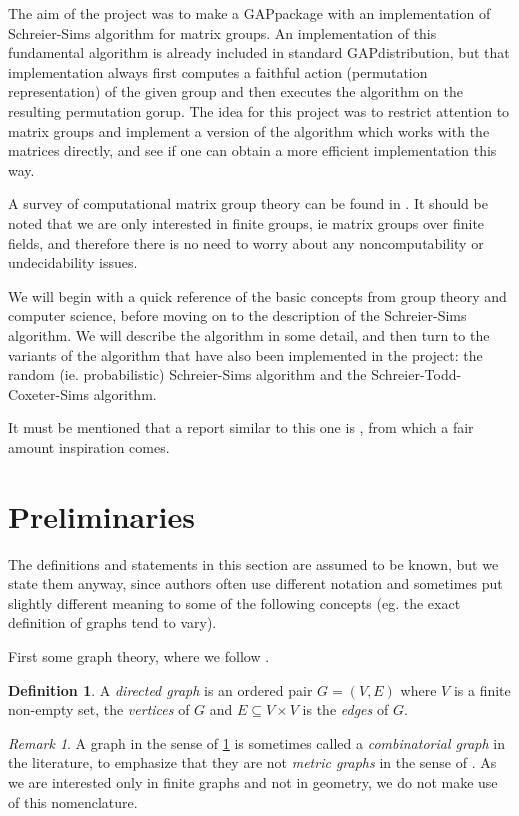 \documentclass[draft]{amsart}
\theoremstyle{plain}
\theoremstyle{definition}
\newtheorem{deff}[theorem]{Definition}
\theoremstyle{remark}
\newtheorem{remark}{Remark}
\newcommand{\GAP}{\textsf{GAP}}
\begin{document}
The aim of the project was to make a \GAP package with an
implementation of Schreier-Sims algorithm for matrix groups. An
implementation of this fundamental algorithm is already included in
standard \GAP distribution, but that implementation always first
computes a faithful action (permutation representation) of the given
group and then executes the algorithm on the resulting permutation
gorup. The idea for this project was to restrict attention to matrix
groups and implement a version of the algorithm which works with the
matrices directly, and see if one can obtain a more efficient
implementation this way.  

A survey of computational matrix group theory can be found in
\cite{niemeyer01}. It should be noted that we are only interested in
finite groups, ie matrix groups over finite fields, and therefore
there is no need to worry about any noncomputability or undecidability
issues.

We will begin with a quick reference of the basic concepts from group
theory and computer science, before moving on to the description of
the Schreier-Sims algorithm. We will describe the algorithm in some
detail, and then turn to the variants of the algorithm that have also
been implemented in the project: the random (ie. probabilistic)
Schreier-Sims algorithm and the Schreier-Todd-Coxeter-Sims algorithm.

It must be mentioned that a report similar to this one is \cite{murray93}, from which a fair amount inspiration comes.

\section{Preliminaries}
The definitions and statements in this section are assumed to be
known, but we state them anyway, since authors often use different
notation and sometimes put slightly different meaning to some of the
following concepts (eg. the exact definition of graphs tend to
vary). 

First some graph theory, where we follow \cite{biggs89}.

\begin{deff} \label{def_graph}
A \emph{directed graph} is an ordered pair $G = (V, E)$ where $V$ is a finite non-empty set, the \emph{vertices} of $G$ and $E \subseteq V \times V$ is the \emph{edges} of $G$.
\end{deff}
\begin{remark}
  A graph in the sense of \ref{def_graph} is sometimes called a
  \emph{combinatorial graph} in the literature, to emphasize that they
  are not \emph{metric graphs} in the sense of \cite{bridson99}. As we
  are interested only in finite graphs and not in geometry, we do not
  make use of this nomenclature.
\end{remark}
\end{document}
